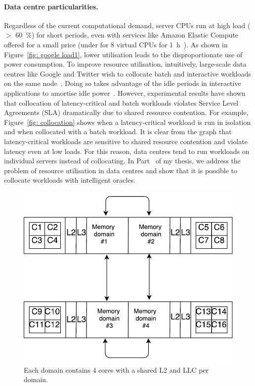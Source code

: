 \paragraph{Data centre particularities.} Regardless of the current computational demand,
server CPUs run at high load ($>$ \SI{60}{\percent}) for short periods, even with
services like Amazon Elastic Compute offered for a small price (under  for 8
virtual CPUs for \SI{1}{\hour}~\citep{ec2pricing}). As shown in Figure~\ref{fig: google
load1}, lower utilisation leads to the disproportionate use of power consumption.  To
improve resource utilisation, intuitively, large-scale data centres like Google and
Twitter wish to collocate batch and interactive workloads on the same
node~\citep{Lo2015Heracles, Dean2013TheScale, Nathuji2010Q-clouds}.  Doing so takes
advantage of the idle periods in interactive applications to amortise idle
power~\citep{Lo2015Heracles}. However, experimental results have shown that collocation of
latency-critical and batch workloads violates Service Level Agreements (SLA) dramatically
due to shared resource contention. For example, Figure~\ref{fig: collocation} shows when a
latency-critical workload is run in isolation and when collocated with a batch workload.
It is clear from the graph that latency-critical workloads are sensitive to shared
resource contention and violate latency even at low loads. For this reason, data centres
tend to run workloads on individual servers instead of collocating.  In Part~ of my
thesis, we address the problem of resource utilisation in data centres and show that it is
possible to collocate workloads with intelligent oracles.
        

\begin{figure}[t] 
    \centering
    \includegraphics[scale=0.75]{Chapter0/Figs/Sharedresource.pdf} 
    \caption[High level view of multicore server system]{ Each domain contains 4 cores with a shared L2 and LLC per domain.} 
    \label{fig: sharedresource} 
\end{figure}

